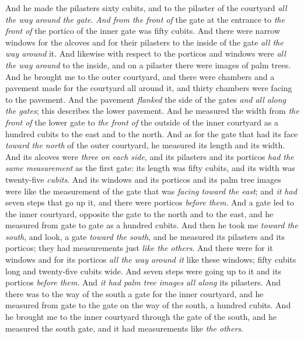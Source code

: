 \begin{biblechapter}
\verse And he made the pilasters sixty cubits, and to the pilaster of the courtyard \textit{all the way around the gate}.
\verse \textit{And from the front of} the gate at the entrance to \textit{the front of} the portico of the inner gate was fifty cubits.
\verse And there were narrow windows for the alcoves and for their pilasters to the inside of the gate \textit{all the way around} it. And likewise with respect to the porticos and windows were \textit{all the way around} to the inside, and on a pilaster there were images of palm trees.
 And he brought me to the outer courtyard, and there were chambers and a pavement made for the courtyard all around it, and thirty chambers were facing to the pavement.
\verse And the pavement \textit{flanked} the side of the gates \textit{and all along the gates}; this describes the lower pavement.
\verse And he measured the width from \textit{the front of} the lower gate to \textit{the front of} the outside of the inner courtyard as a hundred cubits to the east and to the north.
 And as for the gate that had its face \textit{toward the north} of the outer courtyard, he measured its length and its width.
\verse And its alcoves were \textit{three on each side}, and its pilasters and its porticos \textit{had the same measurement} as the first gate: its length was fifty cubits, and its width was twenty-five \textit{cubits}.
\verse And its windows and its porticos and its palm tree images were like the measurement of the gate that was \textit{facing toward the east}; and \textit{it had} seven steps that go up it, and there were porticos \textit{before them}.
\verse And a gate led to the inner courtyard, opposite the gate to the north and to the east, and he measured from gate to gate as a hundred cubits.
 And then he took me \textit{toward the south}, and look, a gate \textit{toward the south}, and he measured its pilasters and its porticos; they had measurements just \textit{like the others}.
\verse And there were for it windows and for its porticos \textit{all the way around it} like these windows; fifty cubits long and twenty-five cubits wide.
\verse And seven steps were going up to it and its porticos \textit{before them}. And \textit{it had palm tree images} \textit{all along} its pilasters.
\verse And there was to the way of the south a gate for the inner courtyard, and he measured from gate to the gate on the way of the south, a hundred cubits.
 And he brought me to the inner courtyard through the gate of the south, and he measured the south gate, and it had measurements like \textit{the others}.

\end{biblechapter}
